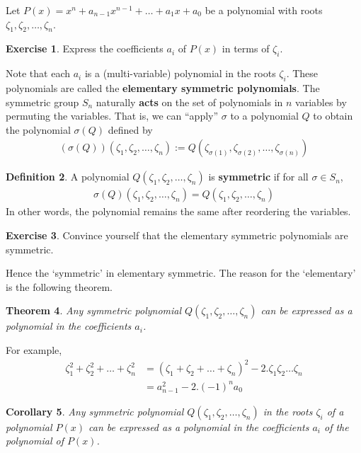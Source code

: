 \documentclass[reqno, 12pt, letter]{article}
\theoremstyle{plain}
\newtheorem{theorem}{Theorem}[section]
\newtheorem{corollary}[theorem]{Corollary}
\theoremstyle{definition}
\newtheorem{definition}[theorem]{Definition}
\newtheorem{exercise}[theorem]{Exercise}
\theoremstyle{remark}
\numberwithin{equation}{section}
\begin{document}
	Let $ P(x) = x^n + a_{n-1} x^{n-1} + \dots + a_1 x + a_0$ be a polynomial with roots $ \zeta_1, \zeta_2, \dots, \zeta_n$.
	
	\begin{exercise}
		Express the coefficients $ a_i$ of $ P(x)$ in terms of $ \zeta_i$.
	\end{exercise}
	Note that each $ a_i$ is a (multi-variable) polynomial in the roots $ \zeta_i$. These polynomials are called the \textbf{elementary symmetric polynomials}.
	The symmetric group $ S_n$ naturally \textbf{acts} on the set of polynomials in $ n$ variables by permuting the variables. 
	That is, we can ``apply'' $\sigma$ to a polynomial $Q$ to obtain the polynomial $\sigma(Q)$ defined by
		\begin{align*}
			(\sigma(Q))(\zeta_1, \zeta_2, \dots, \zeta_n) := Q(\zeta_{\sigma(1)}, \zeta_{\sigma(2)}, \dots, \zeta_{\sigma(n)})
		\end{align*}
		\begin{definition}
			\label{definition:}
			A polynomial $Q(\zeta_1, \zeta_2, \dots, \zeta_n)$ is {\bf symmetric} if for all $\sigma \in S_n $, 
	\begin{align*}
		\sigma(Q) (\zeta_1, \zeta_2, \dots, \zeta_n)= Q(\zeta_1, \zeta_2, \dots, \zeta_n)
	\end{align*}
	In other words, the polynomial remains the same after reordering the variables.
		\end{definition}
		
	\begin{exercise}
		Convince yourself that the elementary symmetric polynomials are symmetric.
	\end{exercise}
	
	Hence the `symmetric' in elementary symmetric. The reason for the `elementary' is the following theorem.
	
	\begin{theorem}
		\label{theorem:fundamental_theorem_symmetric_polynomials}
		Any symmetric polynomial $ Q(\zeta_1, \zeta_2, \dots, \zeta_n)$ can be expressed as a polynomial in the coefficients $ a_i$.
	\end{theorem}
	For example, \begin{align*}
		\zeta_1^2 + \zeta_2^2 + \dots + \zeta_n^2 
		&= (\zeta_1 + \zeta_2 + \dots + \zeta_n)^2 - 2.\zeta_1 \zeta_2 \dots \zeta_n \\
		&= a_{n-1}^2 - 2.(-1)^n a_0
	\end{align*}
	\begin{corollary}
		Any symmetric polynomial $ Q(\zeta_1, \zeta_2, \dots, \zeta_n)$ in the roots $ \zeta_i$ of a polynomial $ P(x)$ can be expressed as a polynomial in the coefficients $ a_i$ of the polynomial of $ P(x)$.
	\end{corollary}
	
\end{document}
